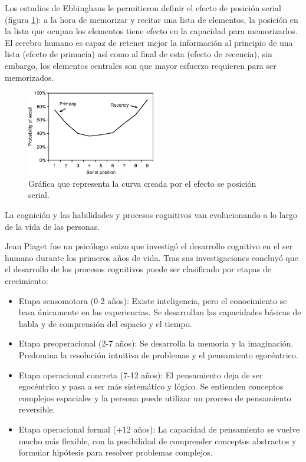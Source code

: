 Los estudios de Ebbinghaus le permitieron definir el efecto de posición serial (figura \ref{fig:EA_posicionSerial}): a la hora de memorizar y recitar una lista de elementos, la posición en la lista que ocupan los elementos tiene efecto en la capacidad para memorizarlos. El cerebro humano es capaz de retener mejor la información al principio de una lista (efecto de primacía) así como al final de esta (efecto de recencia), sin embargo, los elementos centrales son que mayor esfuerzo requieren para ser memorizados.



\begin{figure}
  \centering
\includegraphics[width=0.5\textwidth]{03.EstudioProblema/01.EstadoArte/00.Figuras/01.efecto_serial.jpg}
    \caption{Gráfica que representa la curva creada por el efecto se posición serial. \cite{EA_img_efectoPosicionSerial}}
    \label{fig:EA_posicionSerial}
\end{figure}


La cognición y las habilidades y procesos cognitivos van evolucionando a lo largo de la vida de las personas.

Jean Piaget fue un psicólogo suizo que investigó el desarrollo cognitivo en el ser humano durante los primeros años de vida. Tras sus investigaciones concluyó que el desarrollo de los procesos cognitivos puede ser clasificado por etapas de crecimiento: \cite{EA_cog_piaget}

\begin{itemize}
	\item{Etapa sensomotora (0-2 años): Existe inteligencia, pero el conocimiento se basa únicamente en las experiencias. Se desarrollan las capacidades básicas de habla y de comprensión del espacio y el tiempo.}

	\item{Etapa preoperacional (2-7 años): Se desarrolla la memoria y la imaginación. Predomina la resolución intuitiva de problemas y el pensamiento egocéntrico.}

	\item{Etapa operacional concreta (7-12 años): El pensamiento deja de ser egocéntrico y pasa a ser más sistemático y lógico. Se entienden conceptos complejos espaciales y la persona puede utilizar un proceso de pensamiento reversible.}

	\item{Etapa operacional formal (+12 años): La capacidad de pensamiento se vuelve mucho más flexible, con la posibilidad de comprender conceptos abstractos y formular hipótesis para resolver problemas complejos.}

\end{itemize}

